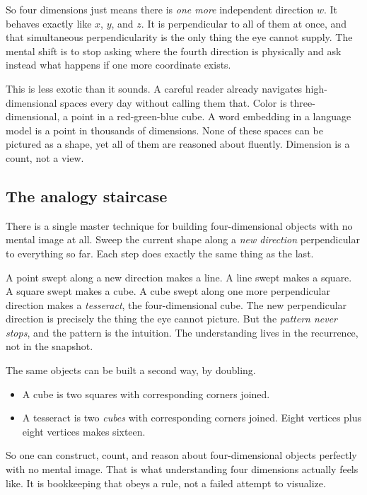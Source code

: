 So four dimensions just means there is \emph{one more} independent direction $w$. It behaves exactly like $x$, $y$, and $z$. It is perpendicular to all of them at once, and that simultaneous perpendicularity is the only thing the eye cannot supply. The mental shift is to stop asking where the fourth direction is physically and ask instead what happens if one more coordinate exists.

This is less exotic than it sounds. A careful reader already navigates high-dimensional spaces every day without calling them that. Color is three-dimensional, a point in a red-green-blue cube. A word embedding in a language model is a point in thousands of dimensions. None of these spaces can be pictured as a shape, yet all of them are reasoned about fluently. Dimension is a count, not a view.

\subsection{The analogy staircase}

There is a single master technique for building four-dimensional objects with no mental image at all. Sweep the current shape along a \emph{new direction} perpendicular to everything so far. Each step does exactly the same thing as the last.

A point swept along a new direction makes a line. A line swept makes a square. A square swept makes a cube. A cube swept along one more perpendicular direction makes a \emph{tesseract}, the four-dimensional cube. The new perpendicular direction is precisely the thing the eye cannot picture. But the \emph{pattern never stops}, and the pattern is the intuition. The understanding lives in the recurrence, not in the snapshot.

The same objects can be built a second way, by doubling.

\begin{itemize}
\item A cube is two squares with corresponding corners joined.
\item A tesseract is two \emph{cubes} with corresponding corners joined. Eight vertices plus eight vertices makes sixteen.
\end{itemize}

So one can construct, count, and reason about four-dimensional objects perfectly with no mental image. That is what understanding four dimensions actually feels like. It is bookkeeping that obeys a rule, not a failed attempt to visualize.

